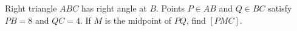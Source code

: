 Right triangle $ABC$ has right angle at $B$. Points $P\in AB$ and $Q\in BC$ satisfy $PB=8$ and $QC=4$. If $M$ is the midpoint of $PQ$, find $[PMC]$.
